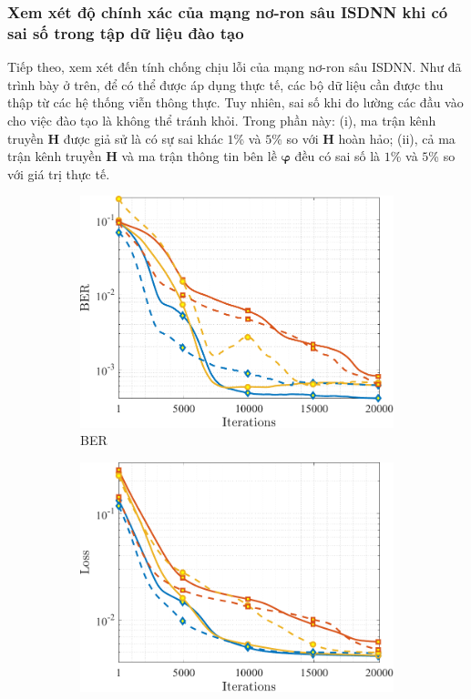 \subsubsection*{\textbf{Xem xét độ chính xác của mạng nơ-ron sâu ISDNN khi có sai số trong tập dữ liệu đào tạo}}
Tiếp theo, xem xét đến tính chống chịu lỗi của mạng nơ-ron sâu ISDNN. Như đã trình bày ở trên, để có thể được áp dụng thực tế, các bộ dữ liệu cần được thu thập từ các hệ thống viễn thông thực. Tuy nhiên, sai số khi đo lường các đầu vào cho việc đào tạo là không thể tránh khỏi. Trong phần này: (i), ma trận kênh truyền $\mathbf{H}$ được giả sử là có sự sai khác $1$\% và $5$\% so với $\mathbf{H}$ hoàn hảo; (ii), cả ma trận kênh truyền $\mathbf{H}$ và ma trận thông tin bên lề ${\boldsymbol{\varphi}}$ đều có sai số là $1$\% và $5$\% so với giá trị thực tế. 
\begin{figure}[ht]
    \centering
    \begin{subfigure}[b]{0.48\textwidth}
        \centering
        \includegraphics[width=\textwidth]{figures/BER_2.pdf}
        \caption{BER}
        \label{fig:ber_2}
    \end{subfigure}
    \hfill
    \begin{subfigure}[b]{0.48\textwidth}
        \centering
        \includegraphics[width=\textwidth]{figures/Loss_2.pdf}

\end{subfigure}
\end{figure}
